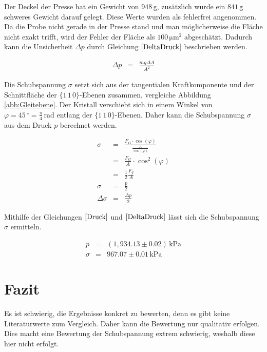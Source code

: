 \documentclass[12pt,a4paper]{scrartcl}
\numberwithin{equation}{section} %
\begin{document}
\noindent
Der Deckel der Presse hat ein Gewicht von $948\mathrm{\,g}$,
zusätzlich wurde ein $841\mathrm{\,g}$ schweres Gewicht darauf gelegt.
Diese Werte wurden als fehlerfrei angenommen. Da die Probe nicht gerade
in der Presse stand und man möglicherweise die Fläche nicht exakt
trifft, wird der Fehler der Fläche als $100\mathrm{\,\mu m^2}$
abgeschätzt. Dadurch kann die Unsicherheit $\Delta p$ durch Gleichung
$\eqref{DeltaDruck}$ beschrieben werden.

\begin{eqnarray}
    \Delta p &=& \frac{mg \Delta A}{A^2} \label{DeltaDruck}
\end{eqnarray}

\noindent
Die Schubspannung $\sigma$ setzt sich aus der tangentialen
Kraftkomponente und der Schnittfläche der
$\lbrace1\,1\,0\rbrace$-Ebenen zusammen, vergleiche Abbildung \ref{abb:Gleitebene}. Der Kristall verschiebt
sich in einem Winkel von
$\varphi=45\,^\circ=\frac{\pi}{4}\mathrm{\,rad}$ entlang der
$\lbrace1\,1\,0\rbrace$-Ebenen. Daher kann die Schubspannung
$\sigma$ aus dem Druck $p$ berechnet werden.

\begin{eqnarray}
    \sigma &=& \frac{F_G \cdot \cos(\varphi)}{\frac{A}{\cos(\varphi)}}\\
        &=&\frac{F_G}{A} \cdot \cos^2(\varphi) \\
        &=& \frac{1}{2}\frac{F_g}{A}\\
    \sigma &=& \frac{p}{2} \\
    \Delta \sigma &=& \frac{\Delta p}{2}
\end{eqnarray}

Mithilfe der Gleichungen $\eqref{Druck}$ und $\eqref{DeltaDruck}$
lässt sich die Schubspannung $\sigma$ ermitteln.

\begin{eqnarray}
    p &=& (1,934.13 \pm 0.02) \mathrm{\,kPa} \\
    \sigma &=& 967.07 \pm 0.01 \mathrm{\,kPa}
\end{eqnarray}

\hypertarget{fazit}{%
\section{Fazit}\label{fazit}}

Es ist schwierig, die Ergebnisse konkret zu bewerten, denn es gibt keine
Literaturwerte zum Vergleich. Daher kann die Bewertung nur qualitativ
erfolgen. Dies macht eine Bewertung der Schubspannung extrem schwierig,
weshalb diese hier nicht erfolgt.
\end{document}
